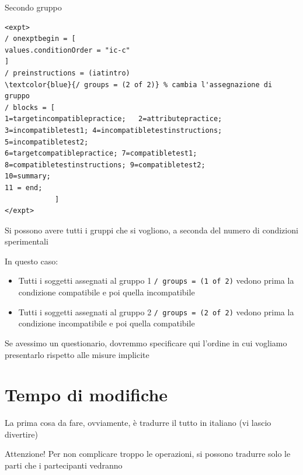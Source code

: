 \documentclass{beamer}
\begin{document}
\begin{frame}[fragile]{Secondo gruppo}
	\begin{footnotesize}
		\begin{Verbatim}[commandchars=\\\{\}]
<expt>
/ onexptbegin = [
values.conditionOrder = "ic-c"
]
/ preinstructions = (iatintro)
\textcolor{blue}{/ groups = (2 of 2)} % cambia l'assegnazione di gruppo
/ blocks = [ 
1=targetincompatiblepractice; 	2=attributepractice; 
3=incompatibletest1; 4=incompatibletestinstructions; 
5=incompatibletest2; 
6=targetcompatiblepractice; 7=compatibletest1; 
8=compatibletestinstructions; 9=compatibletest2; 
10=summary;
11 = end;
			]
</expt>
		\end{Verbatim}
	\end{footnotesize}
\end{frame}

\begin{frame}
	Si possono avere tutti i gruppi che si vogliono, a seconda del numero di condizioni sperimentali 
	
	In questo caso: 
	
	\begin{itemize}
		\item Tutti i soggetti assegnati al gruppo 1 \texttt{/ groups = (1 of 2)} vedono prima la condizione compatibile e poi quella incompatibile
			\item Tutti i soggetti assegnati al gruppo 2 \texttt{/ groups = (2 of 2)} vedono prima la condizione incompatibile e poi quella compatibile
	\end{itemize}

Se avessimo un questionario, dovremmo specificare qui l'ordine in cui vogliamo presentarlo rispetto alle misure implicite
\end{frame}

\section{Tempo di modifiche}

\begin{frame}
	La prima cosa da fare, ovviamente, è tradurre il tutto in italiano (vi lascio divertire)
	
	\vspace{5mm}
	Attenzione! Per non complicare troppo le operazioni, si possono tradurre solo le parti che i partecipanti vedranno
	 
\end{frame}
\end{document}
